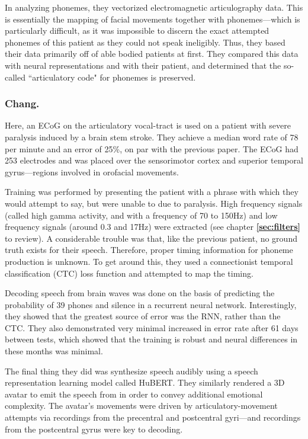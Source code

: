 In analyzing phonemes, they vectorized electromagnetic articulography data. This is essentially the mapping of facial movements together with phonemes---which is particularly difficult, as it was impossible to discern the exact attempted phonemes of this patient as they could not speak ineligibly. Thus, they based their data primarily off of able bodied patients at first. They compared this data with neural representations and with their patient, and determined that the so-called ``articulatory code" for phonemes is preserved. 

\subsubsection{Chang.}

Here, an ECoG on the articulatory vocal-tract is used on a patient with severe paralysis induced by a brain stem stroke. They achieve a median word rate of 78 per minute and an error of 25\%, on par with the previous paper. The ECoG had 253 electrodes and was placed over the sensorimotor cortex and superior temporal gyrus---regions involved in orofacial movements.\newline 

Training was performed by presenting the patient with a phrase with which they would attempt to say, but were unable to due to paralysis. High frequency signals (called high gamma activity, and with a frequency of 70 to 150Hz) and low frequency signals (around 0.3 and 17Hz) were extracted (see chapter \textbf{\ref{sec:filters}} to review). A considerable trouble was that, like the previous patient, no ground truth exists for their speech. Therefore, proper timing information for phoneme production is unknown. To get around this, they used a connectionist temporal classification (CTC) loss function and attempted to map the timing.\newline

Decoding speech from brain waves was done on the basis of predicting the probability of 39 phones and silence in a recurrent neural network. Interestingly, they showed that the greatest source of error was the RNN, rather than the CTC. They also demonstrated very minimal increased in error rate after 61 days between tests, which showed that the training is robust and neural differences in these months was minimal. \newline

The final thing they did was synthesize speech audibly using a speech representation learning model called HuBERT. They similarly rendered a 3D avatar to emit the speech from in order to convey additional emotional complexity. The avatar's movements were driven by articulatory-movement attempts via recordings from the precentral and postcentral gyri---and recordings from the postcentral gyrus were key to decoding. 

